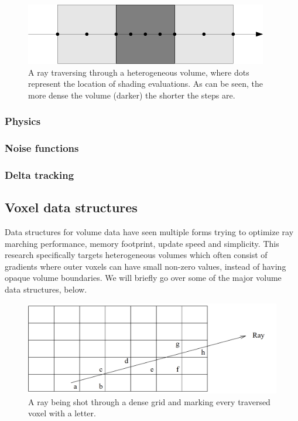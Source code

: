 \begin{figure}[H]
    \centering
    \includegraphics[width=0.9\linewidth]{figures/sample_step_size.png}
    \caption{A ray traversing through a heterogeneous volume, where dots represent the location of shading evaluations. As can be seen, the more dense the volume (darker) the shorter the steps are.}
    \label{fig:sample_step_size}
\end{figure}
\subsubsection{Physics} \label{introduction:path_traced_volume_rendering:physics}
\subsubsection{Noise functions} \label{introduction:path_traced_volume_rendering:noise_functions}
\subsubsection{Delta tracking} \label{introduction:path_traced_volume_rendering:delta_tracking}








\subsection{Voxel data structures} \label{introduction:voxel_data_structures}
Data structures for volume data have seen multiple forms trying to optimize ray marching performance, memory footprint, update speed and simplicity. This research specifically targets heterogeneous volumes which often consist of gradients where outer voxels can have small non-zero values, instead of having opaque volume boundaries. We will briefly go over some of the major volume data structures, below.

\begin{figure}
    \centering
    \includegraphics[width=\linewidth]{figures/dda.png}
    \caption{A ray being shot through a dense grid and marking every traversed voxel with a letter. \cite{amanatides1987fast}}
    \label{fig:dda_traversal}
\end{figure}

